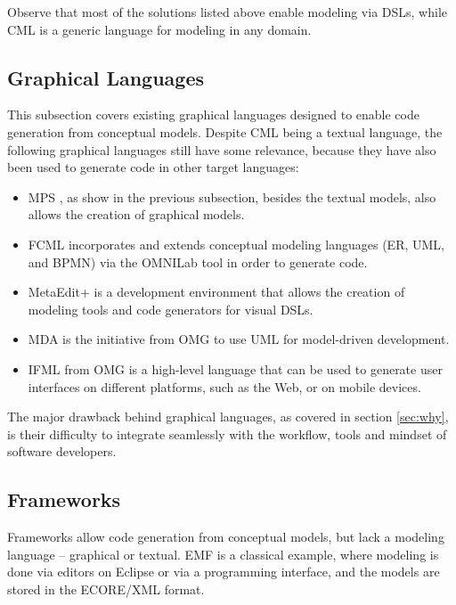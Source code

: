Observe that most of the solutions listed above enable modeling via DSLs,
while CML is a generic language for modeling in any domain.

\subsection{Graphical Languages}

This subsection covers existing graphical languages designed to enable code generation from conceptual models.
Despite CML being a textual language,
the following graphical languages still have some relevance,
because they have also been used to generate code in other target languages:

\begin{itemize}

\item MPS \cite{voelter}, 
as show in the previous subsection,
besides the textual models, 
also allows the creation of graphical models.

\item FCML \cite{fcml} incorporates and extends conceptual modeling languages (ER, UML, and BPMN)
via the OMNILab tool in order to generate code.

\item MetaEdit+ \cite{metaedit} is a development environment that allows the creation of modeling tools
and code generators for visual DSLs.

\item MDA \cite{mda} is the initiative from OMG to use UML \cite{uml} for model-driven development.

\item IFML \cite{ifml} from OMG is a high-level language 
that can be used to generate user interfaces on different platforms,
such as the Web, or on mobile devices.

\end{itemize}

The major drawback behind graphical languages,
as covered in section \ref{sec:why},
is their difficulty to integrate seamlessly with the workflow, tools and mindset of software developers.

\subsection{Frameworks}\label{subsec:frameworks}

Frameworks allow code generation from conceptual models, but lack a modeling language -- graphical or textual. 
EMF \cite{emf} is a classical example,
where modeling is done via editors on Eclipse or via a programming interface,
and the models are stored in the ECORE/XML format. 

